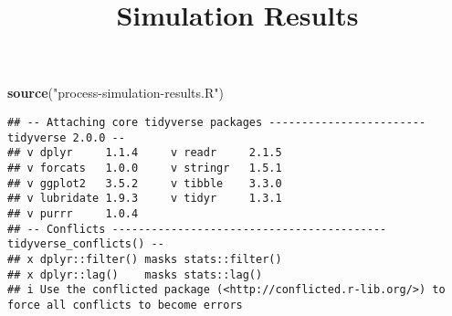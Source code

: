 \documentclass[
]{article}
\title{Simulation Results}
\author{}
\date{\vspace{-2.5em}}
\newenvironment{Shaded}{\begin{snugshade}}{\end{snugshade}}
\newcommand{\FunctionTok}[1]{\textcolor[rgb]{0.13,0.29,0.53}{\textbf{#1}}}
\newcommand{\NormalTok}[1]{#1}
\newcommand{\StringTok}[1]{\textcolor[rgb]{0.31,0.60,0.02}{#1}}
\begin{document}
\maketitle

\begin{Shaded}
\begin{Highlighting}[]
\FunctionTok{source}\NormalTok{(}\StringTok{"process{-}simulation{-}results.R"}\NormalTok{)}
\end{Highlighting}
\end{Shaded}

\begin{verbatim}
## -- Attaching core tidyverse packages ------------------------ tidyverse 2.0.0 --
## v dplyr     1.1.4     v readr     2.1.5
## v forcats   1.0.0     v stringr   1.5.1
## v ggplot2   3.5.2     v tibble    3.3.0
## v lubridate 1.9.3     v tidyr     1.3.1
## v purrr     1.0.4     
## -- Conflicts ------------------------------------------ tidyverse_conflicts() --
## x dplyr::filter() masks stats::filter()
## x dplyr::lag()    masks stats::lag()
## i Use the conflicted package (<http://conflicted.r-lib.org/>) to force all conflicts to become errors
\end{verbatim}
\end{document}
